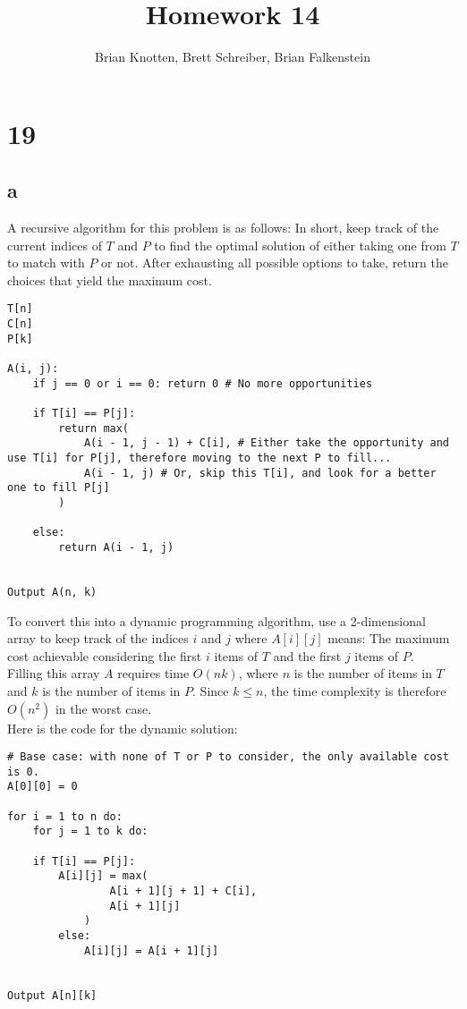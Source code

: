 \documentclass[letterpaper,notitlepage,twoside]{article}
\begin{document}
\title{Homework 14}
\author{Brian Knotten, Brett Schreiber, Brian Falkenstein}
\maketitle

\section*{19}
\subsection*{a}
A recursive algorithm for this problem is as follows:
In short, keep track of the current indices of $T$ and $P$ to find the optimal solution of either taking one from $T$ to match with $P$ or not. After exhausting all possible options to take, return the choices that yield the maximum cost. 
\begin{verbatim}
T[n]
C[n]
P[k]

A(i, j):
    if j == 0 or i == 0: return 0 # No more opportunities

    if T[i] == P[j]:
        return max(
            A(i - 1, j - 1) + C[i], # Either take the opportunity and use T[i] for P[j], therefore moving to the next P to fill...
            A(i - 1, j) # Or, skip this T[i], and look for a better one to fill P[j]
        )
		
    else:
        return A(i - 1, j)
	

Output A(n, k)
\end{verbatim}

To convert this into a dynamic programming algorithm, use a 2-dimensional array to keep track of the indices $i$ and $j$ where $A[i][j]$ means: The maximum cost achievable considering the first $i$ items of $T$ and the first $j$ items of $P$. \\

Filling this array $A$ requires time $O(nk)$, where $n$ is the number of items in $T$ and $k$ is the number of items in $P$. Since $k \leq n$, the time complexity is therefore $O(n^2)$ in the worst case. \\

Here is the code for the dynamic solution:
\begin{verbatim}
# Base case: with none of T or P to consider, the only available cost is 0.
A[0][0] = 0

for i = 1 to n do:
    for j = 1 to k do:
        
	if T[i] == P[j]:
	    A[i][j] = max(
                A[i + 1][j + 1] + C[i],
                A[i + 1][j]
            )
        else:
            A[i][j] = A[i + 1][j]


Output A[n][k]
\end{verbatim}
\end{document}
